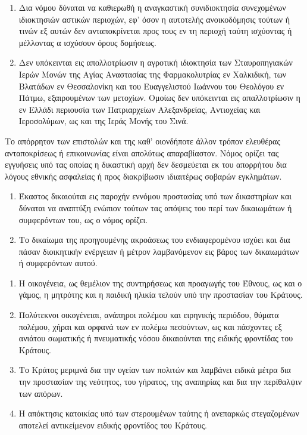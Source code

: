 \documentclass[twoside, a4paper, 10pt]{article}
\begin{document}
\begin{multicols}{2}
\begin{enumerate}
\begin{BigQuote}
\begin{enumerate}
  \item[7.] Δια νόμου δύναται να καθιερωθή η αναγκαστική συνιδιοκτησία συνεχομένων ιδιοκτησιών αστικών περιοχών, εφ' όσον η αυτοτελής ανοικοδόμησις τούτων ή τινών εξ αυτών δεν ανταποκρίνεται προς τους εν τη περιοχή ταύτη ισχύοντας ή μέλλοντας α ισχύσουν όρους δομήσεως.
  \item[8.] Δεν υπόκεινται εις απολλοτρίωσιν η αγροτική ιδιοκτησία των Σταυροπηγιακών Ιερών Μονών της Αγίας Αναστασίας της Φαρμακολυτρίας εν Χαλκιδική, των Βλατάδων εν Θεσσαλονίκη και του Ευαγγελιστού Ιωάννου του Θεολόγου εν Πάτμω, εξαιρουμένων των μετοχίων. Ομοίως δεν υπόκεινται εις απαλλοτρίωσιν η εν Ελλάδι περιουσία των Πατριαρχείων Αλεξανδρείας, Αντιοχείας και Ιεροσολύμων, ως και της Ιεράς Μονής του Σινά.
\end{enumerate}

Το απόρρητον των επιστολών και της καθ' οιονδήποτε άλλον τρόπον ελευθέρας ανταποκρίσεως ή επικοινωνίας είναι απολύτως απαραβίαστον. Νόμος ορίζει τας εγγυήσεις υπό τας οποίας η δικαστική αρχή δεν δεσμεύεται εκ του απορρήτου δια λόγους εθνικής ασφαλείας ή προς διακρίβωσιν ιδιαιτέρως σοβαρών εγκλημάτων.

\begin{enumerate}
  \item[1.] Έκαστος δικαιούται εις παροχήν εννόμου προστασίας  υπό των δικαστηρίων και δύναται  να αναπτύξη ενώπιον τούτων τας απόψεις του περί των δικαιωμάτων ή συμφερόντων του,  ως ο νόμος ορίζει.
  \item[2.] Το δικαίωμα της προηγουμένης ακροάσεως του ενδιαφερομένου ισχύει και δια πάσαν διοικητικήν ενέργειαν ή μέτρον λαμβανόμενον εις βάρος των δικαιωμάτων ή συμφερόντων αυτού.
\end{enumerate}

\begin{enumerate}
  \item[1.] Η οικογένεια, ως θεμέλιον της συντηρήσεως  και προαγωγής του Έθνους, ως και ο γάμος, η μητρότης και η παιδική ηλικία τελούν υπό την προστασίαν του Κράτους.
  \item[2.] Πολύτεκνοι οικογένειαι, ανάπηροι πολέμου και ειρηνικής περιόδου, θύματα πολέμου, χήραι και ορφανά των εν πολέμω πεσούντων, ως και πάσχοντες εξ ανιάτου σωματικής ή πνευματικής νόσου δικαιούνται της ειδικής φροντίδας του Κράτους.
  \item[3.] Το Κράτος μεριμνά δια την υγείαν των πολιτών και λαμβάνει ειδικά μέτρα δια την προστασίαν της νεότητος, του γήρατος, της αναπηρίας και δια την περίθαλψιν των απόρων.
  \item[4.] Η απόκτησις κατοικίας υπό των στερουμένων ταύτης ή ανεπαρκώς στεγαζομένων αποτελεί αντικείμενον ειδικής φροντίδος του Κράτους.
\end{enumerate}


\end{BigQuote}
\end{enumerate}
\end{multicols}
\end{document}
